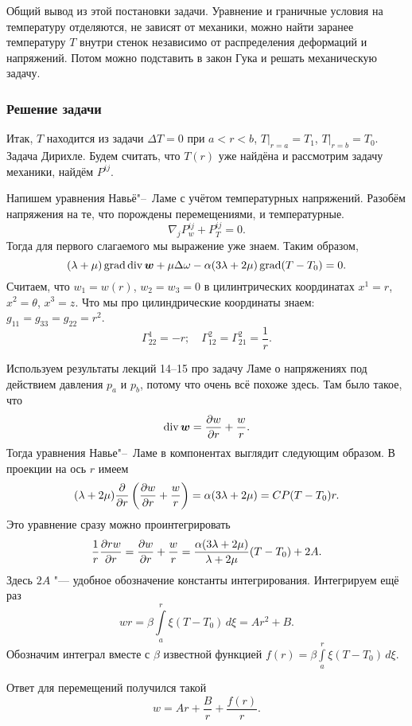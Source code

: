 Общий вывод из этой постановки задачи. Уравнение и граничные условия на температуру отделяются, не зависят от механики, можно найти заранее температуру $T$ внутри стенок независимо от распределения деформаций и напряжений. Потом можно подставить в закон Гука и решать механическую задачу.

\subsubsection{Решение задачи}
Итак, $T$ находится из задачи $\Delta T=0$ при $a<r<b$, $T|_{r=a}=T_1$, $T|_{r=b}=T_0$. Задача Дирихле. Будем считать, что $T(r)$ уже найдёна и рассмотрим задачу механики, найдём $P^{ij}$. 

Напишем уравнения Навьё"--~Ламе с учётом температурных напряжений. Разобём напряжения на те, что порождены перемещениями, и температурные.
\[
  \nabla_j P^{ij}_w + P^{ij}_T=0.
\]
Тогда для первого слагаемого мы выражение уже знаем. 
Таким образом,
\[
  (\lambda+\mu)\operatorname{grad}\operatorname{div}\boldsymbol{w} + \mu \Delta\omega - \alpha(3\lambda + 2\mu)\operatorname{grad}(T-T_0)=0.
\]
Считаем, что $w_1 = w(r)$, $w_2=w_3=0$ в цилинтрических координатах $x^1=r$, $x^2=\theta$, $x^3 = z$. Что мы про цилиндрические координаты знаем: $g_{11} = g_{33} = g_{22}=r^2$.
\[
  \Gamma_{22}^1 = -r;\quad
  \Gamma_{12}^2 = \Gamma_{21}^2 = \frac1r.
\]

Используем результаты лекций 14--15 про задачу Ламе о напряжениях под действием давления $p_a$ и $p_b$, потому что очень всё похоже здесь. Там было такое, что
\[
  \operatorname{div}\boldsymbol{w} = \frac{\partial w}{\partial r} + \frac wr.
\]
Тогда уравнения Навье"--~Ламе в компонентах выглядит следующим образом. В проекции на ось $r$ имеем
\[
  (\lambda+2\mu)\frac{\partial  }{\partial r}\left( \frac{\partial w}{\partial r} + \frac wr \right) = \alpha(3\lambda+2\mu) = CP{(T-T_0)}r.
\]
Это уравнение сразу можно проинтегрировать
\[
  \frac1r\frac{\partial rw}{\partial r} = \frac{\partial w}{\partial r} + \frac wr = \frac{\alpha(3\lambda+2\mu)}{\lambda+2\mu} (T-T_0) + 2A.
\]
Здесь $2A$ "--- удобное обозначение константы интегрирования. Интегрируем ещё раз
\[
  wr = \beta\int\limits_a^r \xi(T-T_0)\,d\xi = Ar^2 + B.
\]
Обозначим интеграл вместе с $\beta$ известной функцией $f(r) = \beta\int\limits_a^r \xi(T-T_0)\,d\xi$.

Ответ для перемещений получился такой
\[
  w = A r + \frac{B}r + \frac{f(r)}r.
\]


